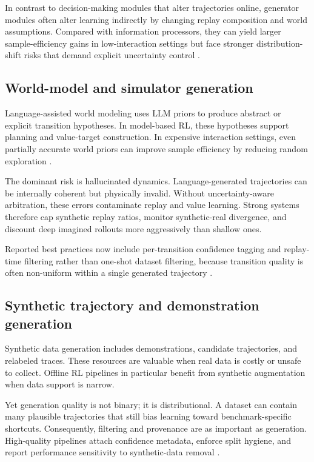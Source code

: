 \documentclass[pdflatex,sn-mathphys-num]{sn-jnl}
\begin{document}
In contrast to decision-making modules that alter trajectories online, generator modules often alter learning indirectly by changing replay composition and world assumptions. Compared with information processors, they can yield larger sample-efficiency gains in low-interaction settings but face stronger distribution-shift risks that demand explicit uncertainty control \cite{arxiv_p_2404_03648,arxiv_p_2511_14460,arxiv_p_2602_07848,arxiv_p_2602_14468}.

\subsection{World-model and simulator generation}
Language-assisted world modeling uses LLM priors to produce abstract or explicit transition hypotheses. In model-based RL, these hypotheses support planning and value-target construction. In expensive interaction settings, even partially accurate world priors can improve sample efficiency by reducing random exploration \cite{arxiv_p_2301_12050,arxiv_p_2602_02454,arxiv_p_2602_11075,arxiv_p_2602_12099}.

The dominant risk is hallucinated dynamics. Language-generated trajectories can be internally coherent but physically invalid. Without uncertainty-aware arbitration, these errors contaminate replay and value learning. Strong systems therefore cap synthetic replay ratios, monitor synthetic-real divergence, and discount deep imagined rollouts more aggressively than shallow ones.

Reported best practices now include per-transition confidence tagging and replay-time filtering rather than one-shot dataset filtering, because transition quality is often non-uniform within a single generated trajectory \cite{arxiv_p_2602_00785,arxiv_p_2602_03022,arxiv_p_2602_12099}.

\subsection{Synthetic trajectory and demonstration generation}
Synthetic data generation includes demonstrations, candidate trajectories, and relabeled traces. These resources are valuable when real data is costly or unsafe to collect. Offline RL pipelines in particular benefit from synthetic augmentation when data support is narrow.

Yet generation quality is not binary; it is distributional. A dataset can contain many plausible trajectories that still bias learning toward benchmark-specific shortcuts. Consequently, filtering and provenance are as important as generation. High-quality pipelines attach confidence metadata, enforce split hygiene, and report performance sensitivity to synthetic-data removal \cite{arxiv_p_2310_20587,arxiv_p_2505_18098,arxiv_p_2601_08107,arxiv_p_2602_14468}.
\end{document}
